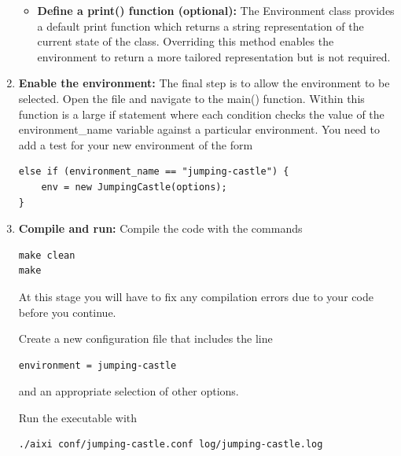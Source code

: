 \documentclass[a4paper,11pt]{article}
\begin{document}
\begin{enumerate}
\begin{itemize}
  \item {\bf Define a print() function (optional):} The Environment class provides a default print function which returns a string representation of the current state of the class. Overriding this method enables the environment to return a more tailored representation but is not required.

  \end{itemize}

\item {\bf Enable the environment:} The final step is to allow the environment to be selected. Open the  file and navigate to the main() function. Within this function is a large if statement where each condition checks the value of the environment\_name variable against a particular environment. You need to add a test for your new environment of the form
    \begin{lstlisting}[frame=single]
else if (environment_name == "jumping-castle") {
    env = new JumpingCastle(options);
}
    \end{lstlisting}


  \item {\bf Compile and run:} Compile the code with the commands
    \lstset{language=bash}
    \begin{lstlisting}[frame=single]
make clean
make
    \end{lstlisting}
    At this stage you will have to fix any compilation errors due to your code before you continue.

Create a new configuration file  that includes the line
    \begin{lstlisting}[frame=single]
environment = jumping-castle
    \end{lstlisting}
and an appropriate selection of other options. 

Run the executable with
    \begin{lstlisting}[frame=single]
./aixi conf/jumping-castle.conf log/jumping-castle.log
    \end{lstlisting}
\end{enumerate}
\end{document}
